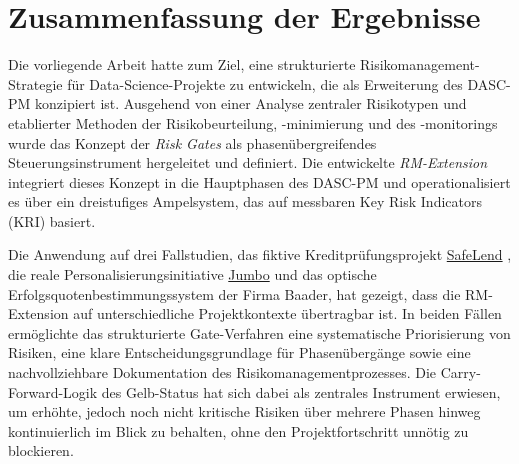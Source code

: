 \section{Zusammenfassung der Ergebnisse}

Die vorliegende Arbeit hatte zum Ziel, eine strukturierte Risikomanagement-Strategie 
für Data-Science-Projekte zu entwickeln, die als Erweiterung des DASC-PM konzipiert 
ist. Ausgehend von einer Analyse zentraler Risikotypen und etablierter Methoden der 
Risikobeurteilung, -minimierung und des -monitorings wurde das Konzept der 
\textit{Risk Gates} als phasenübergreifendes Steuerungsinstrument hergeleitet und 
definiert. Die entwickelte \textit{RM-Extension} integriert dieses Konzept in die 
Hauptphasen des DASC-PM und operationalisiert es über ein dreistufiges Ampelsystem, 
das auf messbaren Key Risk Indicators (KRI) basiert.

Die Anwendung auf drei Fallstudien, das fiktive Kreditprüfungsprojekt \hyperref[sec:case_study_1]{SafeLend}
, die reale Personalisierungsinitiative \hyperref[sec:case_study_2]{Jumbo} und das 
optische Erfolgsquotenbestimmungssystem der Firma Baader, hat gezeigt,
dass die RM-Extension auf unterschiedliche Projektkontexte übertragbar ist.
In beiden Fällen ermöglichte das strukturierte Gate-Verfahren 
eine systematische Priorisierung von Risiken, eine klare Entscheidungsgrundlage 
für Phasenübergänge sowie eine nachvollziehbare Dokumentation des Risikomanagementprozesses.
Die Carry-Forward-Logik des Gelb-Status hat sich dabei als zentrales 
Instrument erwiesen, um erhöhte, jedoch noch nicht kritische Risiken über 
mehrere Phasen hinweg kontinuierlich im Blick zu behalten, ohne den Projektfortschritt unnötig zu blockieren.

